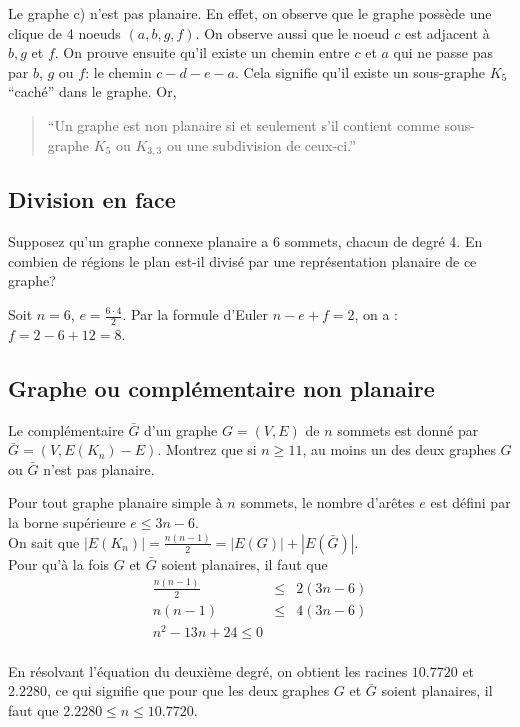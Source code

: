 \begin{solution}
  Le graphe c) n'est pas planaire.
  En effet, on observe que le graphe possède une clique de 4 noeuds $(a,b,g,f)$.
  On observe aussi que le noeud $c$ est adjacent à $b, g$ et $f$.
  On prouve ensuite qu'il existe un chemin entre $c$ et $a$ qui ne passe pas par $b$, $g$ ou $f$:
  le chemin $c-d-e-a$. Cela signifie qu'il existe un sous-graphe $K_5$ ``caché'' dans le graphe. Or,

  \begin{quotation}
    ``Un graphe est non planaire si et seulement s’il contient comme sous-graphe $K_5$ ou $K_{3,3}$ ou une subdivision de ceux-ci.''
  \end{quotation}

\end{solution}

\subsection{Division en face}
Supposez qu’un graphe connexe planaire a 6 sommets, chacun de degré 4. En combien de régions le plan est-il divisé par une représentation planaire de ce graphe?

\begin{solution} Soit $n = 6$, $e = \frac{6 \cdot 4}{2}$. Par la formule d'Euler $ n - e + f = 2$, on a : $f = 2 - 6 + 12 = 8$.
\end{solution}

\subsection{Graphe ou complémentaire non planaire}
Le complémentaire $\bar{G}$ d’un graphe $G = (V,E)$ de $n$ sommets est donné par $\bar{G} = (V, E(K_n) - E)$. Montrez que si $n \geq 11$, au moins un des deux graphes $G$ ou $\bar{G}$ n’est pas planaire.

\begin{solution} Pour tout graphe planaire simple à $n$ sommets, le nombre d'arêtes $e$ est défini par la borne supérieure  $e \leq 3n - 6$. \\
On sait que $|E(K_{n})| = \frac{n(n-1)}{2} = |E(G)| + |E(\bar{G})|$. \\
Pour qu'à la fois $G$ et $\bar{G}$ soient planaires, il faut que 
\[ \begin{array}{rcl}
 \frac{n(n-1)}{2} &\leq& 2 (3n - 6) \\
  n(n-1) &\leq& 4(3n - 6) \\
  n^2 - 13n + 24 \leq 0 \\
 \end{array} \]
 
 En résolvant l'équation du deuxième degré, on obtient les racines $10.7720$ et $2.2280$, ce qui signifie que pour que les deux graphes $G$ et $\bar{G}$ soient planaires, il faut que $2.2280 \leq n \leq 10.7720$.
 \end{solution}

